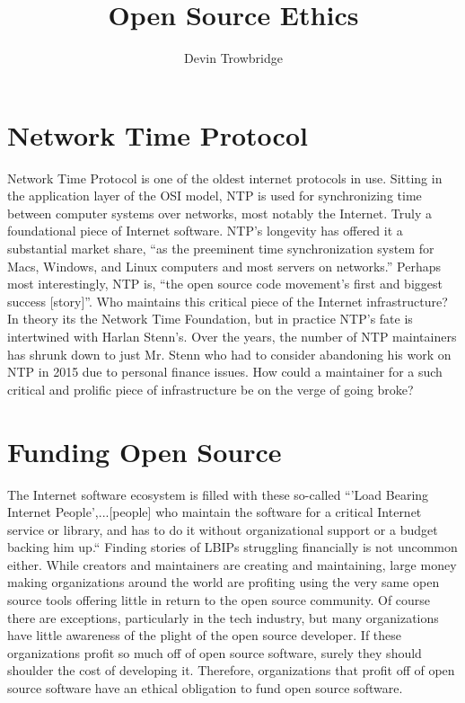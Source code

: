 \documentclass[format=sigconf]{acmart}
\title{Open Source Ethics}
\author{Devin Trowbridge}
\affiliation{%
  \department{Computer Science and Software Engineering}
  \institution{Auburn University}
  \email{dkt0003@auburn.edu}
  \city{Huntsville}
  \state{Alabama}
  \country{United States}
}
\begin{document}
\maketitle

\section{Network Time Protocol}

Network Time Protocol is one of the oldest internet protocols in use. Sitting in the application layer of the OSI model, NTP is used for synchronizing time between computer systems over networks, most notably the Internet. Truly a foundational piece of Internet software. NTP's longevity has offered it a substantial market share, ``as the preeminent time synchronization system for Macs, Windows, and Linux computers and most servers on networks.'' \cite{ntp} Perhaps most interestingly, NTP is, ``the open source code movement's first and biggest success [story]''. \cite{ntp} Who maintains this critical piece of the Internet infrastructure? In theory its the Network Time Foundation, but in practice NTP's fate is intertwined with Harlan Stenn's. Over the years, the number of NTP maintainers has shrunk down to just Mr. Stenn who had to consider abandoning his work on NTP in 2015 due to personal finance issues. How could a maintainer for a such critical and prolific piece of infrastructure be on the verge of going broke?

\section{Funding Open Source}

The Internet software ecosystem is filled with these so-called ``'Load Bearing Internet People',...[people] who maintain the software for a critical Internet service or library, and has to do it without organizational support or a budget backing him up.`` \cite{lbip} Finding stories of LBIPs struggling financially is not uncommon either. While creators and maintainers are creating and maintaining, large money making organizations around the world are profiting using the very same open source tools offering little in return to the open source community. Of course there are exceptions, particularly in the tech industry, but many organizations have little awareness of the plight of the open source developer. If these organizations profit so much off of open source software, surely they should shoulder the cost of developing it. Therefore, organizations that profit off of open source software have an ethical obligation to fund open source software.
\end{document}
